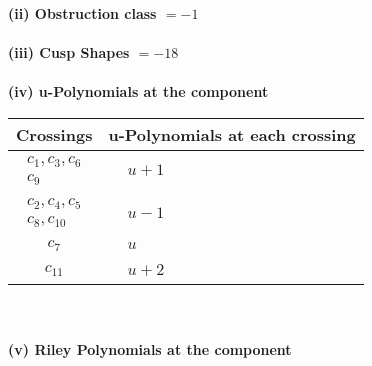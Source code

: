 \documentclass[1p]{elsarticle_modified}
\theoremstyle{definition}
\begin{document}
\flushleft \textbf{(ii) Obstruction class $= -1$}\\~\\
\flushleft \textbf{(iii) Cusp Shapes $= -18$}\\~\\
\newpage\renewcommand{\arraystretch}{1}
\flushleft \textbf{(iv) u-Polynomials at the component}\newline \\
\begin{tabular}{m{50pt}|m{274pt}}
Crossings & \hspace{64pt}u-Polynomials at each crossing \\
\hline $$\begin{aligned}c_{1},c_{3},c_{6}\\c_{9}\end{aligned}$$&$\begin{aligned}
&u+1
\end{aligned}$\\
\hline $$\begin{aligned}c_{2},c_{4},c_{5}\\c_{8},c_{10}\end{aligned}$$&$\begin{aligned}
&u-1
\end{aligned}$\\
\hline $$\begin{aligned}c_{7}\end{aligned}$$&$\begin{aligned}
&u
\end{aligned}$\\
\hline $$\begin{aligned}c_{11}\end{aligned}$$&$\begin{aligned}
&u+2
\end{aligned}$\\
\hline
\end{tabular}\\~\\
\newpage\renewcommand{\arraystretch}{1}
\flushleft \textbf{(v) Riley Polynomials at the component}\newline \\
\end{document}
